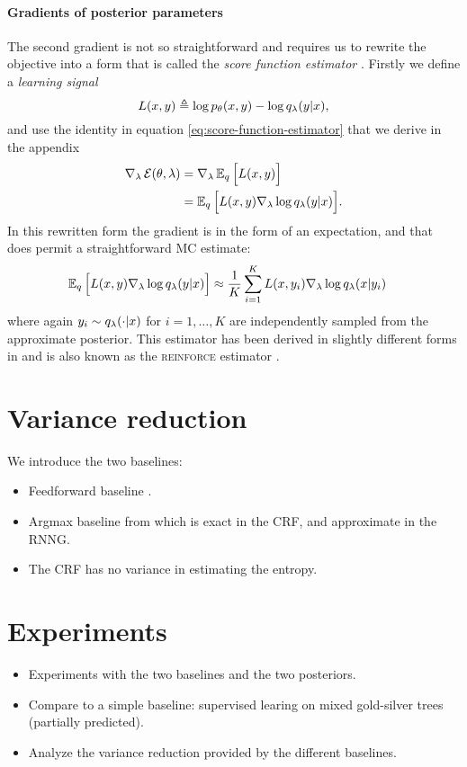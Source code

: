 \paragraph{Gradients of posterior parameters}
The second gradient is not so straightforward and requires us to rewrite the objective into a form that is called the \textit{score function estimator} \citep{Fu2006}. Firstly we define a \textit{learning signal}
\begin{equation}
  L(x, y) \triangleq \log p_{\theta}(x, y) - \log q_{\lambda}(y | x),
\end{equation}
and use the identity in equation \ref{eq:score-function-estimator} that we derive in the appendix
\begin{align*}
  \nabla_{\lambda} \operatorname{\mathcal{E}}(\theta, \lambda)
    &= \nabla_{\lambda} \operatorname{\mathbb{E}}_{q} \Big[ L(x, y) \Big] \\
    &= \operatorname{\mathbb{E}}_{q} \Big[ L(x, y) \nabla_{\lambda} \log q_{\lambda}(y | x) \Big].
\end{align*}
In this rewritten form the gradient is in the form of an expectation, and that does permit a straightforward MC estimate:
\begin{align}
    \operatorname{\mathbb{E}}_{q} \Big[ L(x, y) \nabla_{\lambda} \log q_{\lambda}(y | x) \Big]
        &\approx \frac{1}{K}\sum_{i=1}^K  L(x, y_i)\nabla_{\lambda} \log q_{\lambda}(x | y_i)
\end{align}
where again $y_i \sim q_{\lambda}(\cdot | x)$ for $i=1,\dots,K$ are independently sampled from the approximate posterior. This estimator has been derived in slightly different forms in \citet{Williams1992:REINFORCE,Paisley+2012:VISS,Mnih+2014:NVIL,Ranganath+2014:BBVI,Miao+2016} and is also known as the \textsc{reinforce} estimator \citep{Williams1992:REINFORCE}.


\section{Variance reduction}
We introduce the two baselines:
\begin{itemize}
  \item Feedforward baseline \citep{Miao+2016}.
  \item Argmax baseline from \citet{Rennie+2017:argmax-baseline} which is exact in the CRF, and approximate in the RNNG.
  \item The CRF has no variance in estimating the entropy.
\end{itemize}


\section{Experiments}
\begin{itemize}
  \item Experiments with the two baselines and the two posteriors.
  \item Compare to a simple baseline: supervised learing on mixed gold-silver trees (partially predicted).
  \item Analyze the variance reduction provided by the different baselines.
\end{itemize}


